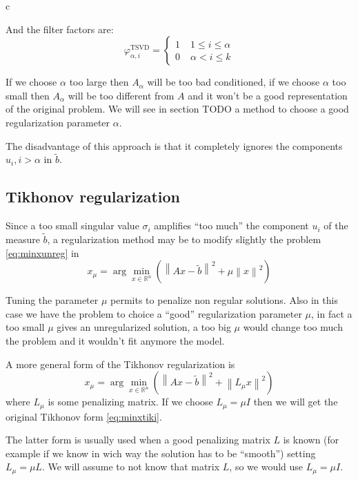 c\documentclass[a4paper,10pt]{article}
\theoremstyle{plain}
\theoremstyle{definition}
\theoremstyle{remark}
\newcommand{\pa}[1]{\left(#1\right)}
\newcommand{\norm}[1]{\left\|#1\right\|}
\begin{document}
And the filter factors are:
\begin{equation}
  \label{eq:TSVDfilter}
  \varphi ^{\text{TSVD}}_{\alpha,i} = \left\{
    \begin{matrix}
      1 \; &1\le i \le \alpha\\
      0 \; &\alpha < i \le k
    \end{matrix}
    \right.
\end{equation}

If we choose $\alpha$ too large then $A_\alpha$ will be too bad
conditioned, if we choose $\alpha$ too small then $A_\alpha$ will be
too different from $A$ and it won't be a good representation of the
original problem. We will see in section TODO a method to choose a
good regularization parameter $\alpha$.

The disadvantage of this approach is that it completely ignores the
components $u_i, i>\alpha$ in $\tilde b$.

\subsection{Tikhonov regularization}
\label{sec:tikhonov}

Since a too small singular value $\sigma _i$ amplifies ``too much''
the component $u_i$ of the measure $\tilde b$, a regularization method
may be to modify slightly the problem \ref{eq:minxunreg} in
\begin{equation}
  \label{eq:minxtiki}
  x_\mu = \arg\min _{x \in \mathbb{R}^n} \pa{ \norm{Ax -\tilde b}^2 + \mu\norm{x}^2}
\end{equation}

Tuning the parameter $\mu$ permits to penalize non regular
solutions. Also in this case we have the problem to choice a ``good''
regularization parameter $\mu$, in fact a too small $\mu$ gives an
unregularized solution, a too big $\mu$ would change too much the
problem and it wouldn't fit anymore the model.

A more general form of the Tikhonov regularization is
\begin{equation}
  \label{eq:minxtikgen}
  x_\mu = \arg\min _{x \in \mathbb{R}^n} \pa{ \norm{Ax -\tilde b}^2 +
    \norm{L_\mu x}^2}
\end{equation}
where $L_\mu$ is some penalizing matrix. If we choose $L_\mu = \mu
I$ then we will get the original Tikhonov form \ref{eq:minxtiki}.

The latter form is usually used when a good penalizing matrix $L$ is
known (for example if we know in wich way the solution has to be
``smooth'') setting $L_\mu = \mu L$. We will assume to not know that
matrix $L$, so we would use $L_\mu = \mu I$.
\end{document}
